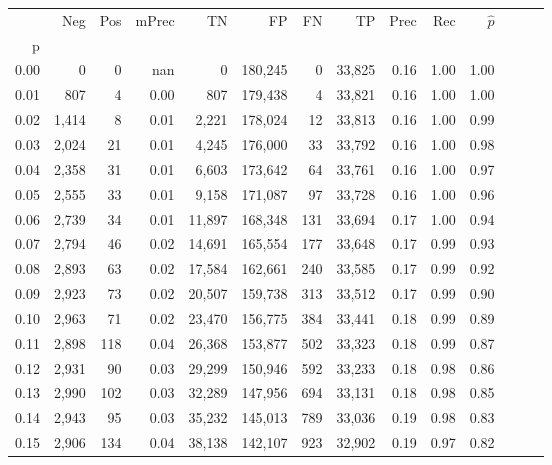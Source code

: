 \begin{tabular}{rrrrrrrrrrrrrr}
\toprule
{} &    Neg &  Pos & mPrec &       TN &       FP &      FN &      TP &  Prec &   Rec & $\hat{p}$ \\
p    &        &      &       &          &          &         &         &       &       &           \\
\midrule
0.00 &      0 &    0 &   nan &        0 &  180,245 &       0 &  33,825 &  0.16 &  1.00 &      1.00 \\
0.01 &    807 &    4 &  0.00 &      807 &  179,438 &       4 &  33,821 &  0.16 &  1.00 &      1.00 \\
0.02 &  1,414 &    8 &  0.01 &    2,221 &  178,024 &      12 &  33,813 &  0.16 &  1.00 &      0.99 \\
0.03 &  2,024 &   21 &  0.01 &    4,245 &  176,000 &      33 &  33,792 &  0.16 &  1.00 &      0.98 \\
0.04 &  2,358 &   31 &  0.01 &    6,603 &  173,642 &      64 &  33,761 &  0.16 &  1.00 &      0.97 \\
0.05 &  2,555 &   33 &  0.01 &    9,158 &  171,087 &      97 &  33,728 &  0.16 &  1.00 &      0.96 \\
0.06 &  2,739 &   34 &  0.01 &   11,897 &  168,348 &     131 &  33,694 &  0.17 &  1.00 &      0.94 \\
0.07 &  2,794 &   46 &  0.02 &   14,691 &  165,554 &     177 &  33,648 &  0.17 &  0.99 &      0.93 \\
0.08 &  2,893 &   63 &  0.02 &   17,584 &  162,661 &     240 &  33,585 &  0.17 &  0.99 &      0.92 \\
0.09 &  2,923 &   73 &  0.02 &   20,507 &  159,738 &     313 &  33,512 &  0.17 &  0.99 &      0.90 \\
0.10 &  2,963 &   71 &  0.02 &   23,470 &  156,775 &     384 &  33,441 &  0.18 &  0.99 &      0.89 \\
0.11 &  2,898 &  118 &  0.04 &   26,368 &  153,877 &     502 &  33,323 &  0.18 &  0.99 &      0.87 \\
0.12 &  2,931 &   90 &  0.03 &   29,299 &  150,946 &     592 &  33,233 &  0.18 &  0.98 &      0.86 \\
0.13 &  2,990 &  102 &  0.03 &   32,289 &  147,956 &     694 &  33,131 &  0.18 &  0.98 &      0.85 \\
0.14 &  2,943 &   95 &  0.03 &   35,232 &  145,013 &     789 &  33,036 &  0.19 &  0.98 &      0.83 \\
0.15 &  2,906 &  134 &  0.04 &   38,138 &  142,107 &     923 &  32,902 &  0.19 &  0.97 &      0.82 \\

\end{tabular}
